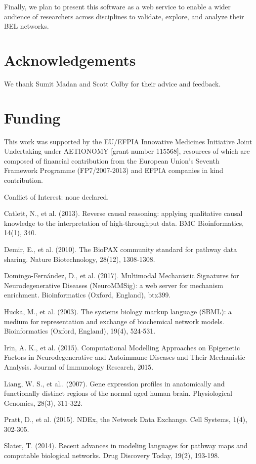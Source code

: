 \documentclass{bioinfo}
\begin{document}
Finally, we plan to present this software as a web service to enable a wider audience of researchers across disciplines to validate, explore, and analyze their BEL networks.

\section*{Acknowledgements}

We thank Sumit Madan and Scott Colby for their advice and feedback.

\section*{Funding}

This work was supported by the EU/EFPIA Innovative Medicines Initiative Joint Undertaking under AETIONOMY [grant number 115568], resources of which are composed of financial contribution from the European Union's Seventh Framework Programme (FP7/2007-2013) and EFPIA companies in kind contribution.

Conflict of Interest: none declared.

\begin{thebibliography}{}

Catlett, N., et al. (2013). Reverse causal reasoning: applying qualitative causal knowledge to the interpretation of high-throughput data. BMC Bioinformatics, 14(1), 340.

Demir, E., et al. (2010). The BioPAX community standard for pathway data sharing. Nature Biotechnology, 28(12), 1308-1308.

Domingo-Fern\'{a}ndez, D., et al. (2017). Multimodal Mechanistic Signatures for Neurodegenerative Diseases (NeuroMMSig): a web server for mechanism enrichment. Bioinformatics (Oxford, England), btx399.

Hucka, M., et al. (2003). The systems biology markup language (SBML): a medium for representation and exchange of biochemical network models. Bioinformatics (Oxford, England), 19(4), 524-531.

Irin, A. K., et al. (2015). Computational Modelling Approaches on Epigenetic Factors in Neurodegenerative and Autoimmune Diseases and Their Mechanistic Analysis. Journal of Immunology Research, 2015.

Liang, W. S., et al.. (2007). Gene expression profiles in anatomically and functionally distinct regions of the normal aged human brain. Physiological Genomics, 28(3), 311-322.

Pratt, D., et al. (2015). NDEx, the Network Data Exchange. Cell Systems, 1(4), 302-305.

Slater, T. (2014). Recent advances in modeling languages for pathway maps and computable biological networks. Drug Discovery Today, 19(2), 193-198.

\end{thebibliography}
\end{document}
